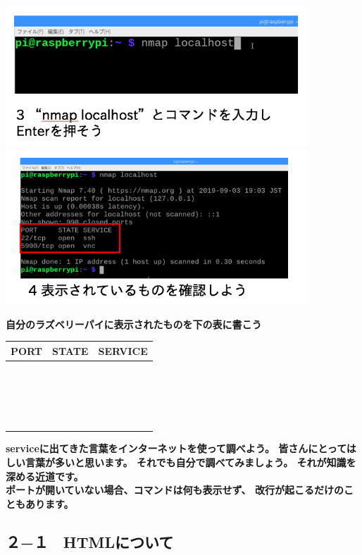 \documentclass[a4paper,12pt,dvipdfmx]{jarticle}
\newcounter{Exercise}
\newcounter {PagePtr}
\begin{document}
\includegraphics[width=0.85\textwidth]{ome7-img032.png}
\bigskip
\includegraphics[width=0.85\textwidth]{ome7-img031.png}
\flushleft

\bigskip
{\bfseries
	自分のラズベリーパイに表示されたものを下の表に書こう}

\begin{flushleft}
	\tablefirsthead{}
	\tablehead{}
	\tabletail{}
	\tablelasttail{}
	\begin{supertabular}{|m{5.467cm}|m{5.4690003cm}|m{5.155cm}|}
		\hline
		PORT &
		STATE &
		SERVICE\\\hline
		~
		&
		~
		&
		~
		\\\hline
		~
		&
		~
		&
		~
		\\\hline
		~
		&
		~
		&
		~
		\\\hline
		~
		&
		~
		&
		~
		\\\hline
	\end{supertabular}
\end{flushleft}
{\bfseries
serviceに出てきた言葉をインターネットを使って調べよう。
皆さんにとってはしい言葉が多いと思います。
それでも自分で調べてみましょう。
それが知識を深める近道です。\\
ポートが開いていない場合、コマンドは何も表示せず、
改行が起こるだけのこともあります。
}

\clearpage\subsection*{２−１　HTMLについて}
\label{P:HTML}
\end{document}
